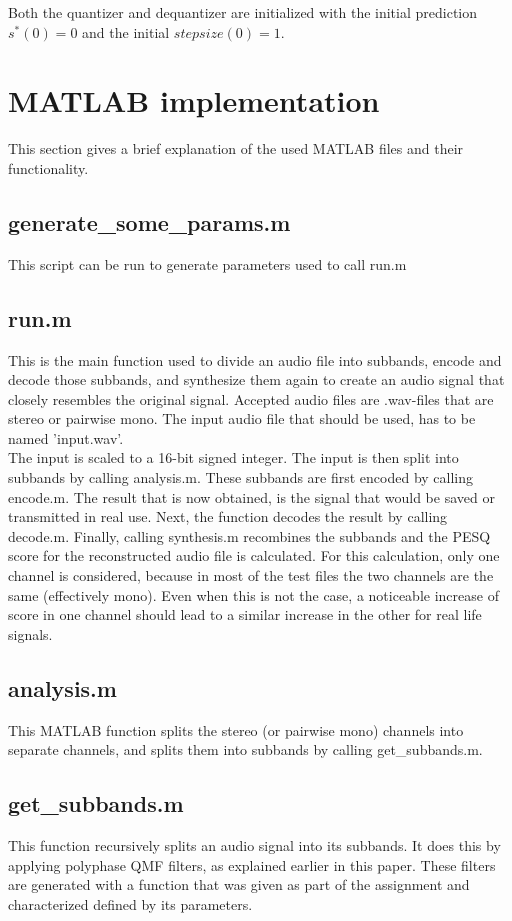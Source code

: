 \documentclass[a4paper]{article}
\begin{document}
Both the quantizer and dequantizer are initialized with the initial prediction $s^*(0) = 0$ and the initial $stepsize(0) = 1$.
\section{MATLAB implementation}
This section gives a brief explanation of the used MATLAB files and their functionality.

\subsection{generate\_some\_params.m}
This script can be run to generate parameters used to call run.m

\subsection{run.m}
This is the main function used to divide an audio file into subbands, encode and decode those subbands, and synthesize them again to create an audio signal that closely resembles the original signal. Accepted audio files are .wav-files that are stereo or pairwise mono. The input audio file that should be used, has to be named 'input.wav'.\\

The input is scaled to a 16-bit signed integer. The input is then split into subbands by calling analysis.m. These subbands are first encoded by calling encode.m. The result that is now obtained, is the signal that would be saved or transmitted in real use. Next, the function decodes the result by calling decode.m. Finally, calling synthesis.m recombines the subbands and the PESQ score for the reconstructed audio file is calculated. For this calculation, only one channel is considered, because in most of the test files the two channels are the same (effectively mono). Even when this is not the case, a noticeable increase of score in one channel should lead to a similar increase in the other for real life signals.

\subsection{analysis.m}
This MATLAB function splits the stereo (or pairwise mono) channels into separate channels, and splits them into subbands by calling get\_subbands.m.

\subsection{get\_subbands.m}
This function recursively splits an audio signal into its subbands. It does this by applying polyphase QMF filters, as explained earlier in this paper. These filters are generated with a function that was given as part of the assignment and characterized defined by its parameters.\\
\end{document}

